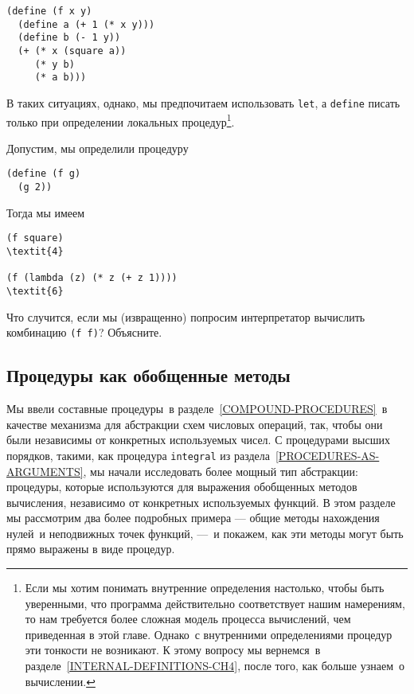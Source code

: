 \begin{Verbatim}[fontsize=\small]
(define (f x y)
  (define a (+ 1 (* x y)))
  (define b (- 1 y))
  (+ (* x (square a))
     (* y b)
     (* a b)))
\end{Verbatim}
В таких ситуациях, однако, мы предпочитаем использовать
{\tt let}, 
а {\tt define} писать только при определении
локальных процедур\footnote{Если мы хотим понимать внутренние определения
настолько, чтобы быть уверенными, что программа действительно
соответствует нашим намерениям, то нам требуется более
сложная модель процесса вычислений, чем приведенная в
этой главе.  Однако~с внутренними определениями процедур эти тонкости
не возникают. К этому вопросу мы вернемся~в разделе~\ref{INTERNAL-DEFINITIONS-CH4}, после того, как
больше узнаем~о вычислении.
}.
\begin{exercise}{1.34}\label{EX1.34}%
Допустим, мы определили процедуру

\begin{Verbatim}
(define (f g)
  (g 2))
\end{Verbatim}
Тогда мы имеем

\begin{Verbatim}
(f square)
\textit{4}

(f (lambda (z) (* z (+ z 1))))
\textit{6}
\end{Verbatim}
Что случится, если мы (извращенно) попросим интерпретатор вычислить
комбинацию {\tt (f f)}? Объясните.
\end{exercise}

\subsection{Процедуры как обобщенные методы}
\label{PROCEDURES-AS-GENERAL-METHODS}

Мы ввели составные процедуры~в разделе~\ref{COMPOUND-PROCEDURES}~в качестве механизма для
абстракции схем числовых операций, так, чтобы они были независимы от
конкретных используемых чисел. С процедурами высших порядков,
такими, как процедура {\tt integral} из раздела~\ref{PROCEDURES-AS-ARGUMENTS}, мы начали исследовать
более мощный тип абстракции: процедуры, которые используются 
для выражения обобщенных методов вычисления, независимо от конкретных
используемых функций. В этом разделе мы рассмотрим два более
подробных примера --- общие методы нахождения нулей~и неподвижных
точек функций, ---~и покажем, как эти методы могут быть прямо выражены 
в виде процедур.

